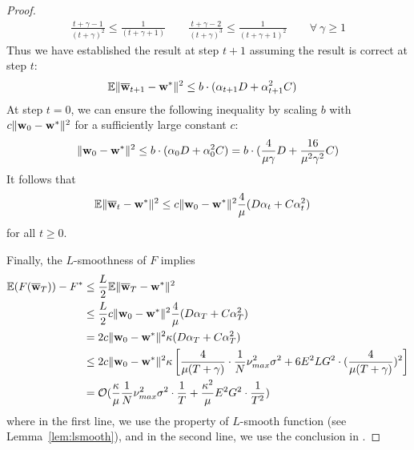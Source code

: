 \begin{proof}
\begin{align*}
	\frac{t+\gamma-1}{(t+\gamma)^{2}} \leq\frac{1}{(t+\gamma+1)}   \hspace{2em}
	\frac{t+\gamma-2}{(t+\gamma)^{3}} \leq\frac{1}{(t+\gamma+1)^{2}}  \hspace{2em}  \forall\ \gamma\geq1
	\end{align*}
	Thus we have established the result at step $t+1$ assuming the result is correct at step $t$:
	\begin{align*}
	\mathbb{E}\|{\overline{\mathbf{w}}}_{t+1}-{\mathbf{w}}^{\ast}\|^{2} & \leq b\cdot(\alpha_{t+1}D+\alpha_{t+1}^{2}C)
	\end{align*}
	At step $t=0$, we can ensure the following inequality by scaling $b$ with $c\|{\mathbf{w}}_{0}-{\mathbf{w}}^{\ast}\|^{2}$ for a sufficiently large constant
	$c$:
	\begin{align*}
	\|{\mathbf{w}}_{0}-{\mathbf{w}}^{\ast}\|^{2} \leq b\cdot(\alpha_{0}D+\alpha_{0}^{2}C) =b\cdot(\frac{4}{\mu\gamma}D+\frac{16}{\mu^{2}\gamma^{2}}C)
	\end{align*}
	It follows that 
	\begin{align}
	\mathbb{E}\|\ov{w}_{t}-\vw^{\ast}\|^{2} & \leq c\|\vw_{0}-\vw^{\ast}\|^{2}\frac{4}{\mu}(D\alpha_{t}+C\alpha_{t}^{2})
	\label{eq:th1:1}
	\end{align}
	for all $t\geq0$. 
	
	Finally, the $L$-smoothness of $F$ implies 
	\begin{align*}
	\mathbb{E}(F({\overline{\mathbf{w}}}_{T}))-F^{\ast} & \leq\frac{L}{2}\mathbb{E}\|{\overline{\mathbf{w}}}_{T}-{\mathbf{w}}^{\ast}\|^{2}\\ 
	& \leq\frac{L}{2}c\|{\mathbf{w}}_{0}-{\mathbf{w}}^{\ast}\|^{2}\frac{4}{\mu}(D\alpha_{T}+C\alpha_{T}^{2})\\
	& =2c\|{\mathbf{w}}_{0}-{\mathbf{w}}^{\ast}\|^{2}\kappa(D\alpha_{T}+C\alpha_{T}^{2})\\
	& \leq2c\|{\mathbf{w}}_{0}-{\mathbf{w}}^{\ast}\|^{2}\kappa\left[\frac{4}{\mu(T+\gamma)}\cdot\frac{1}{N}\nu_{max}^{2}\sigma^{2}+6E^{2}LG^{2}\cdot(\frac{4}{\mu(T+\gamma)})^{2}\right]\\
	& =\mathcal{O}(\frac{\kappa}{\mu}\frac{1}{N}\nu_{max}^{2}\sigma^{2}\cdot\frac{1}{T}+\frac{\kappa^{2}}{\mu}E^{2}G^{2}\cdot\frac{1}{T^{2}})
	\end{align*}
	where in the first line, we use the property of $L$-smooth function (see Lemma~\ref{lem:lsmooth}), and in the second line, we use the conclusion in \eq{\ref{eq:th1:1}}. 
	

\end{proof}

